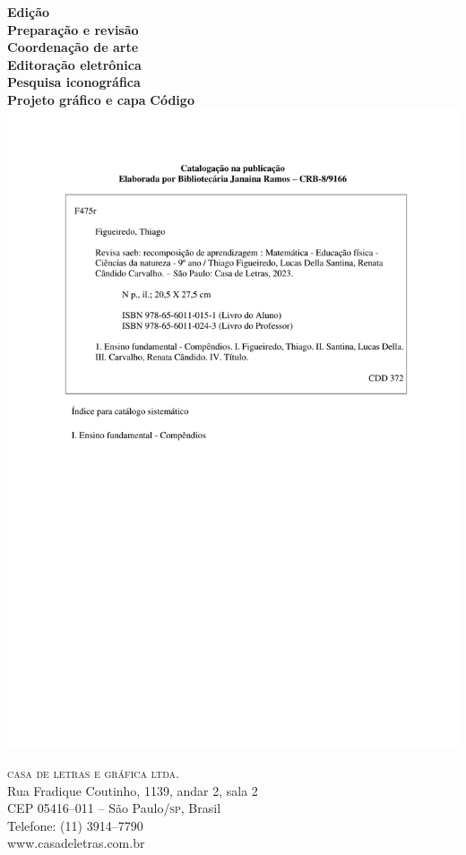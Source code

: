 \textbf{Edição}\\
\textbf{Preparação e revisão}\\
\textbf{Coordenação de arte}\\
\textbf{Editoração eletrônica}\\
\textbf{Pesquisa iconográfica}\\
\textbf{Projeto gráfico e capa}
\textbf{Código}
\noindent\includegraphics{../fichas/9MAT.pdf}

\vfill

\textsc{casa de letras e gráfica ltda.}\\
Rua Fradique Coutinho, 1139, andar 2, sala 2\\
CEP 05416--011 -- São Paulo/\textsc{sp}, Brasil\\
Telefone: (11) 3914--7790\\\smallskip
www.casadeletras.com.br\\

\endgroup
\pagebreak
